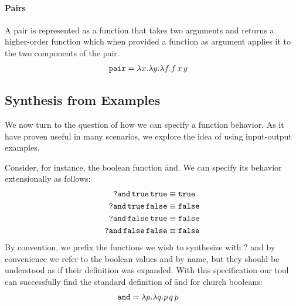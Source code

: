 \paragraph{Pairs}
%
A pair is represented as a function that takes two arguments
and returns a higher-order function which when provided a
function as argument applies it to the two components of the
pair.
%
\begin{align*}
  \texttt{pair} &= \lambda x. \lambda y. \lambda f.f\,x\,y
\end{align*}




\subsection{Synthesis from Examples} \label{sec:io}
%
We now turn to the question of how we can specify a function
behavior.
%
As it have proven useful in many scenarios, we explore the
idea of using input-output examples.

Consider, for instance, the boolean function \f{and}.
We can specify its behavior extensionally as follows:
%
\begin{align*}
\texttt{?and}\,\texttt{true}\,\texttt{true}    &\equiv \texttt{true} \\
\texttt{?and}\,\texttt{true}\,\texttt{false}   &\equiv \texttt{false} \\
\texttt{?and}\,\texttt{false}\,\texttt{true}   &\equiv \texttt{false} \\
\texttt{?and}\,\texttt{false}\, \texttt{false} &\equiv \texttt{false} \\
\end{align*}
%
By convention, we prefix the functions we wish to synthesize
with \f{?} and by convenience we refer to the boolean values
\true and \false by name, but they should be understood as
if their definition was expanded.
%
With this specification our tool can successfully find the
standard definition of \f{and} for church booleans:
%
\begin{align}
  \label{eq:and-def}
  \texttt{and} &= \lambda p. \lambda q. p\,q\,p
\end{align}

